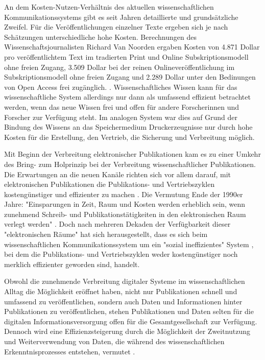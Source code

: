 An dem Kosten-Nutzen-Verhältnis des aktuellen wissenschaftlichen Kommunikationssystems gibt es seit Jahren detaillierte und grundsätzliche Zweifel. Für die Veröffentlichungen einzelner Texte ergeben sich je nach Schätzungen unterschiedliche hohe Kosten. Berechnungen des Wissenschaftsjournalisten Richard Van Noorden ergaben Kosten von 4.871 Dollar pro veröffentlichtem Text im tradierten Print und Online Subskriptionsmodell ohne freien Zugang, 3.509 Dollar bei der reinen Onlineveröffentlichung im Subskriptionsmodell ohne freien Zugang und 2.289 Dollar unter den Bedinungen von Open Access frei zugänglich. \cite{van_2013_true}. Wissenschaftliches Wissen kann für das wissenschaftliche System allerdings nur dann als umfassend effizient betrachtet werden, wenn das neue Wissen frei und offen für andere Forscherinnen und Forscher zur Verfügung steht. Im analogen System war dies auf Grund der Bindung des Wissens an das Speichermedium Druckerzeugnisse nur durch hohe Kosten für die Erstellung, den Vertrieb, die Sicherung und Verbreitung möglich.

Mit Beginn der Verbreitung elektronischer Publikationen kam es zu einer Umkehr des Bring- zum Holprinzip bei der Verbreitung wissenschaftlicher Publikationen. Die Erwartungen an die neuen Kanäle richten sich vor allem darauf, mit elektronischen Publikationen die Publikations- und Vertriebszyklen kostengünstiger und effizienter zu machen \cite{Brueggemann-Klein_1995}. Die Vermutung Ende der 1990er Jahre: "Einsparungen in Zeit, Raum und Kosten werden erheblich sein, wenn zunehmend Schreib- und Publikationstätigkeiten in den elektronischen Raum verlegt werden" \cite{roberts_1999_scholarly}. Doch nach mehreren Dekaden der Verfügbarkeit dieser "elektronischen Räume" hat sich herausgestellt, dass es sich beim wissenschaftlichen Kommunikationssystem um ein "sozial ineffizientes" System \cite[:47]{mueller-langer_2010}, bei dem die Publikations- und Vertriebszyklen weder kostengünstiger noch merklich effizienter geworden sind, handelt.

Obwohl die zunehmende Verbreitung digitaler Systeme im wissenschaftlichen Alltag die Möglichkeit eröffnet haben, nicht nur Publikationen schnell und umfassend zu veröffentlichen, sondern auch Daten und Informationen hinter Publikationen zu veröffentlichen, stehen Publikationen und Daten selten für die digitalen Informationsversorgung offen für die Gesamtgesellschaft zur Verfügung. Dennoch wird eine Effizienzsteigerung durch die Möglichkeit der Zweitnutzung und Weiterverwendung von Daten, die während des wissenschaftlichen Erkenntnisprozesses entstehen, vermutet \cite{RIN_2010_open_research}.

